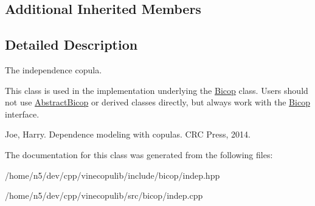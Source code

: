 \subsection*{Additional Inherited Members}


\subsection{Detailed Description}
The independence copula. 

This class is used in the implementation underlying the \hyperlink{classvinecopulib_1_1_bicop}{Bicop} class. Users should not use \hyperlink{classvinecopulib_1_1_abstract_bicop}{Abstract\+Bicop} or derived classes directly, but always work with the \hyperlink{classvinecopulib_1_1_bicop}{Bicop} interface.

Joe, Harry. Dependence modeling with copulas. C\+RC Press, 2014. 

The documentation for this class was generated from the following files\+:\begin{DoxyCompactItemize}
\item 
/home/n5/dev/cpp/vinecopulib/include/bicop/indep.\+hpp\item 
/home/n5/dev/cpp/vinecopulib/src/bicop/indep.\+cpp\end{DoxyCompactItemize}
